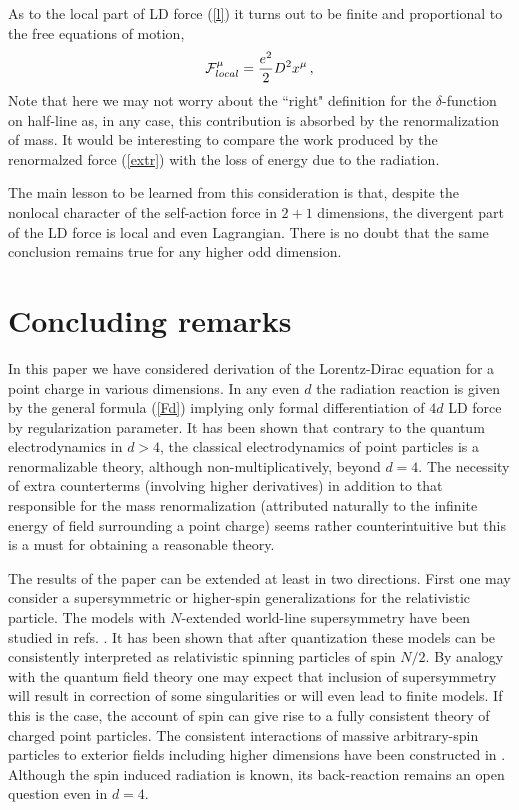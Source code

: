 \documentclass[a4paper,12pt]{article}
\begin{document}
As to the local part of LD force (\ref{l}) it turns out to be finite and
proportional to the free equations of motion,
\begin{equation}
{\cal F}_{local}^\mu=\frac{e^2}2D^2x^\mu\,,
\end{equation}
Note that here we may not worry about the ``right" definition for the $%
\delta $-function on half-line as, in any case, this contribution is
absorbed by the renormalization of mass. It would be interesting to compare
the work produced by the renormalzed force (\ref{extr}) with the loss of
energy due to the radiation.

The main lesson to be learned from this consideration is that, despite the
nonlocal character of the self-action force in $2+1$ dimensions, the
divergent part of the LD force is local and even Lagrangian. There is no
doubt that the same conclusion remains true for any higher odd dimension.

\section{ Concluding remarks}

In this paper we have considered derivation of the Lorentz-Dirac
equation for a point charge in various dimensions.
In any even $d$
the radiation reaction is given by the general formula (\ref{Fd})
implying only formal differentiation of $4d$ LD force by
regularization parameter.  It has been shown that contrary to the
quantum electrodynamics in $d>4$, the classical electrodynamics of
point particles is a renormalizable theory, although
non-multiplicatively, beyond $d=4$. The necessity of extra
counterterms (involving higher derivatives) in addition to that
responsible for the mass renormalization (attributed naturally to the
infinite energy of field surrounding a point charge) seems rather
counterintuitive but this is a must for obtaining a reasonable
theory.

The results of the paper can be extended at least in two directions. First
one may consider a supersymmetric or higher-spin generalizations for the
relativistic particle. The models with $N$-extended world-line supersymmetry
have been studied in refs. \cite{GT,HPPT}. It has been shown that after
quantization these models can be consistently interpreted as relativistic
spinning particles of spin $N/2$. By analogy with the quantum field theory
one may expect that inclusion of supersymmetry will result in correction of
some singularities or will even lead to finite models. If this is the case,
the account of spin can give rise to a fully consistent theory of charged
point particles. The consistent interactions of massive arbitrary-spin
particles to exterior fields including higher dimensions have been
constructed in \cite{LShS,LShSh}. Although the spin induced radiation is
known, its back-reaction remains an open question even in $d=4$.
\end{document}
